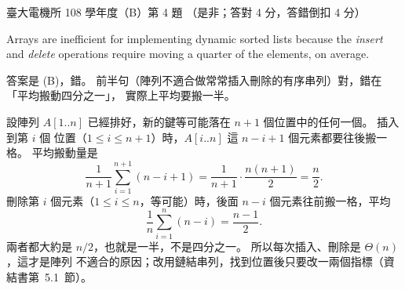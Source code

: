\begin{pastexam}[label={px:ntu-108-ee-dsb-04}]{臺大電機所 108 學年度（B）第 4 題}
（是非；答對 4 分，答錯倒扣 4 分）

Arrays are inefficient for implementing dynamic sorted lists because the \textit{insert} and
\textit{delete} operations require moving a quarter of the elements, on average.
\end{pastexam}

\begin{pastsoln}
答案是 (B)，錯。 前半句（陣列不適合做常常插入刪除的有序串列）對，錯在「平均搬動四分之一」，
實際上平均要搬一半。

設陣列 $A[1..n]$ 已經排好，新的鍵等可能落在 $n + 1$ 個位置中的任何一個。 插入到第 $i$ 個
位置（$1 \le i \le n + 1$）時，$A[i..n]$ 這 $n - i + 1$ 個元素都要往後搬一格。 平均搬動量是
\[
\frac{1}{n + 1} \sum_{i=1}^{n+1} (n - i + 1) = \frac{1}{n + 1} \cdot \frac{n(n + 1)}{2} = \frac{n}{2}.
\]
刪除第 $i$ 個元素（$1 \le i \le n$，等可能）時，後面 $n - i$ 個元素往前搬一格，平均
\[
\frac{1}{n} \sum_{i=1}^{n} (n - i) = \frac{n - 1}{2}.
\]
兩者都大約是 $n/2$，也就是一半，不是四分之一。 所以每次插入、刪除是 $\Theta(n)$，這才是陣列
不適合的原因；改用鏈結串列，找到位置後只要改一兩個指標（資結書第~5.1~節）。
\end{pastsoln}
